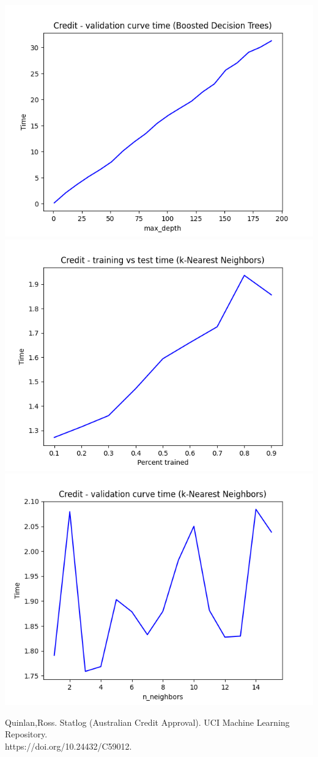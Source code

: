 \documentclass{article}
\begin{document}
\begin{center}
    \includegraphics[width=.45\linewidth]{credit-boosted-validation_curve-time.png}
    \includegraphics[width=.45\linewidth]{credit-k_nearest-error-time.png}
    \includegraphics[width=.45\linewidth]{credit-k_nearest-validation_curve-time.png}
\end{center}

\pagebreak



Quinlan,Ross. Statlog (Australian Credit Approval). UCI Machine Learning Repository.\\ https://doi.org/10.24432/C59012.
\end{document}
